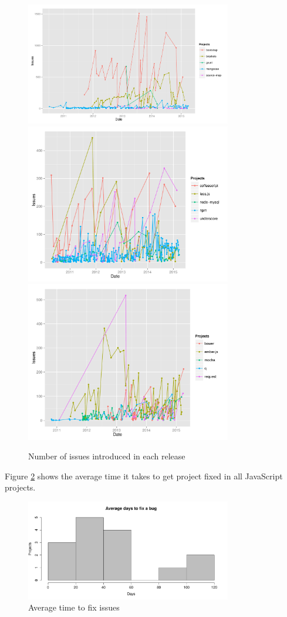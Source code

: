 \begin{figure}[thb!]
	\caption{Number of issues introduced in each release}
	\label{fig:number_of_issues}
	\includegraphics[width=90mm,scale=0.5]{figures/issues_per_release}
	\includegraphics[width=90mm,scale=0.5]{figures/issues_per_release_2}
	\includegraphics[width=90mm,scale=0.5]{figures/issues_per_release_3}
\end{figure}

 Figure \ref{fig:avg_issue_fix} shows the average time it takes to get project fixed in all JavaScript projects.
 
\begin{figure}[thb!]
	\caption{Average time to fix issues}
	\label{fig:avg_issue_fix}
	\includegraphics[width=90mm,scale=0.5]{figures/average_days_to_fix_bugs}

\end{figure}


